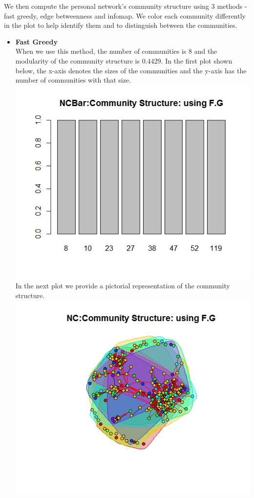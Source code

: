 \documentclass{article}
\begin{document}
We then compute the personal network's community structure using 3 methods - fast greedy,  edge betweenness and 
infomap. We color each community differently in the plot to help identify them and to distinguish between the communities.
\begin{itemize}
	\item \textbf{Fast Greedy}\\
	When we use this method, the number of communities is $8$ and the modularity of the community
	structure is $0.4429$.
	In the first plot shown below, the x-axis denotes the sizes of the communities and the y-axis has the number of communities with that size.\\
	\includegraphics[scale=0.4]{q5a} \\
	In the next plot we provide a pictorial representation of the community structure.\\
	\includegraphics[scale=0.4]{q5c} \\ 

\end{itemize}
\end{document}

